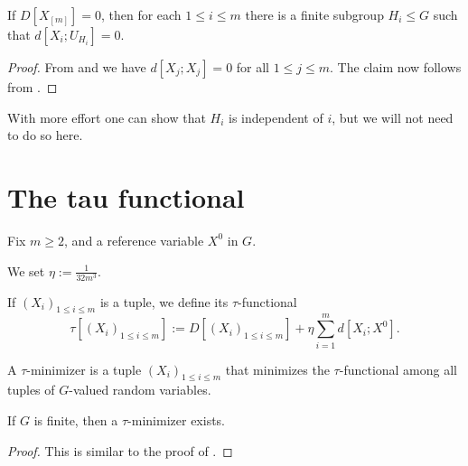 \begin{proposition}[Vanishing]\label{multi-zero}\leanok
If $D[X_{[m]}]=0$, then for each $1 \leq i \leq m$ there is a finite subgroup $H_i \leq G$ such that $d[X_i; U_{H_i}] = 0$.
\end{proposition}

\begin{proof}\leanok  From  and  we have $d[X_j; X_j]=0$ for all $1 \leq j \leq m$.  The claim now follows from .
\end{proof}

With more effort one can show that $H_i$ is independent of $i$, but we will not need to do so here.

\section{The tau functional}

Fix $m \geq 2$, and a reference variable $X^0$ in $G$.

\begin{definition}[$\eta$]\label{eta-def-multi}\leanok
We set $\eta := \frac{1}{32m^3}$.
\end{definition}

\begin{definition}\label{tau-def-multi}\leanok  If $(X_i)_{1 \leq i \leq m}$ is a tuple, we define its $\tau$-functional
$$ \tau[ (X_i)_{1 \leq i \leq m}] := D[(X_i)_{1 \leq i \leq m}] + \eta \sum_{i=1}^m d[X_i; X^0].$$
\end{definition}

\begin{definition}
  \label{tau-min-multi}
  \leanok

  A $\tau$-minimizer is a tuple $(X_i)_{1 \leq i \leq m}$ that minimizes the $\tau$-functional
  among all tuples of $G$-valued random variables.
\end{definition}

\begin{proposition}\label{tau-min-exist-multi}\leanok  If $G$ is finite, then a $\tau$-minimizer exists.
\end{proposition}

\begin{proof}\leanok This is similar to the proof of .
\end{proof}

